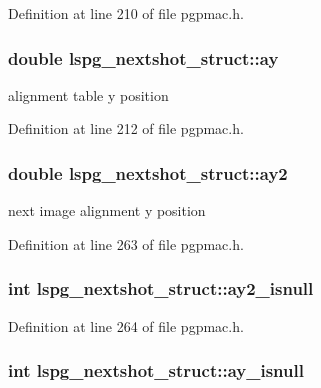 Definition at line 210 of file pgpmac.h.\hypertarget{structlspg__nextshot__struct_a9e20b9a0aeb41f7f7d653a1c60335bf1}{
\subsubsection[{ay}]{\setlength{\rightskip}{0pt plus 5cm}double {\bf lspg\_\-nextshot\_\-struct::ay}}}
\label{structlspg__nextshot__struct_a9e20b9a0aeb41f7f7d653a1c60335bf1}


alignment table y position 

Definition at line 212 of file pgpmac.h.\hypertarget{structlspg__nextshot__struct_ad13759740204b42e379161f98815f3d0}{
\subsubsection[{ay2}]{\setlength{\rightskip}{0pt plus 5cm}double {\bf lspg\_\-nextshot\_\-struct::ay2}}}
\label{structlspg__nextshot__struct_ad13759740204b42e379161f98815f3d0}


next image alignment y position 

Definition at line 263 of file pgpmac.h.\hypertarget{structlspg__nextshot__struct_ad0f50ec6339296d3d39c8d95131ab6b5}{
\subsubsection[{ay2\_\-isnull}]{\setlength{\rightskip}{0pt plus 5cm}int {\bf lspg\_\-nextshot\_\-struct::ay2\_\-isnull}}}
\label{structlspg__nextshot__struct_ad0f50ec6339296d3d39c8d95131ab6b5}


Definition at line 264 of file pgpmac.h.\hypertarget{structlspg__nextshot__struct_a9da91abc8090532ed98ccd47a3bab775}{
\subsubsection[{ay\_\-isnull}]{\setlength{\rightskip}{0pt plus 5cm}int {\bf lspg\_\-nextshot\_\-struct::ay\_\-isnull}}}
\label{structlspg__nextshot__struct_a9da91abc8090532ed98ccd47a3bab775}


